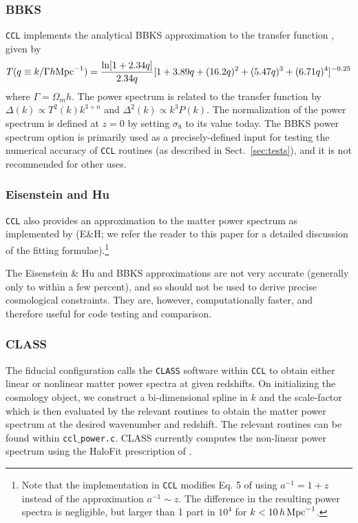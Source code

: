 \documentclass[\docopts]{\docclass}
\newcommand{\ccl}{{\tt CCL}\xspace}
\begin{document}
\subsubsection{BBKS}
\ccl implements the analytical BBKS approximation to the transfer function \citep{BBKS}, given by
\begin{equation}
T(q\equiv k/\Gamma h {\rm Mpc}^{-1}) = \frac{\ln[1+2.34q]}{2.34q}[1+3.89q+(16.2q)^2+(5.47q)^3+(6.71q)^4]^{-0.25}
\end{equation}
where $\Gamma = \Omega_m h$.
The power spectrum is related to the transfer function by $\Delta(k)\propto T^2(k)k^{3+n}$ and $\Delta^2(k)\propto k^3P(k)$. The normalization of the power spectrum is defined at $z=0$ by setting $\sigma_8$ to its value today.
The BBKS power spectrum option is primarily used as a precisely-defined input for testing the numerical accuracy of \ccl routines (as described in Sect.~\ref{sec:tests}), and it is not recommended for other uses.

\subsubsection{Eisenstein and Hu}
\ccl also provides an approximation to the matter power spectrum as implemented by \citet{1998ApJ...496..605E} (E\&H; we refer the reader to this paper for a detailed discussion of the fitting formulae).\footnote{Note that the implementation in \ccl modifies Eq. 5 of \citet{1998ApJ...496..605E} using $a^{-1}=1+z$ instead of the approximation $a^{-1}\sim z$. The difference in the resulting power spectra is negligible, but larger than 1 part in $10^4$ for $k<10\,h\,{\rm Mpc}^{-1}$.}

The Eisenstein \& Hu and BBKS approximations are not very accurate (generally only to within a few percent), and so should not be used to derive precise cosmological constraints. They are, however, computationally faster, and therefore useful for code testing and comparison.

\subsubsection{CLASS}
The fiducial configuration calls the {\tt CLASS} software \citep{class} within \ccl to obtain either linear or nonlinear matter power spectra at given redshifts. On initializing the cosmology object, we construct a bi-dimensional spline in $k$ and the scale-factor which is then evaluated by the relevant routines to obtain the matter power spectrum at the desired wavenumber and redshift. The relevant routines can be found within {\tt ccl$\_$power.c}. CLASS currently computes the non-linear power spectrum using the HaloFit prescription of \cite{CLASS_halofit}.
\end{document}

